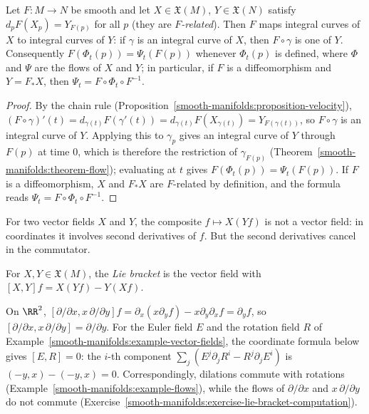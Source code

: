 \begin{proposition}\label{smooth-manifolds:proposition-naturality-flows}
Let $F \colon M \to N$ be smooth and let $X \in \mathfrak{X}(M)$, $Y \in \mathfrak{X}(N)$ satisfy $d_pF(X_p) = Y_{F(p)}$ for all $p$ (they are \emph{$F$-related}).
Then $F$ maps integral curves of $X$ to integral curves of $Y$: if $\gamma$ is an integral curve of $X$, then $F \circ \gamma$ is one of $Y$. Consequently
$F(\Phi_t(p)) = \Psi_t(F(p))$ whenever $\Phi_t(p)$ is defined, where $\Phi$ and $\Psi$ are the flows of $X$ and $Y$; in particular, if $F$ is a diffeomorphism and
$Y = F_*X$, then $\Psi_t = F \circ \Phi_t \circ F^{-1}$.
\end{proposition}

\begin{proof}
By the chain rule (Proposition~\ref{smooth-manifolds:proposition-velocity}), $(F \circ \gamma)'(t) = d_{\gamma(t)}F(\gamma'(t)) = d_{\gamma(t)}F(X_{\gamma(t)}) = Y_{F(\gamma(t))}$,
so $F \circ \gamma$ is an integral curve of $Y$. Applying this to $\gamma_p$ gives an integral curve of $Y$ through $F(p)$ at time $0$, which is therefore the
restriction of $\gamma_{F(p)}$ (Theorem~\ref{smooth-manifolds:theorem-flow}); evaluating at $t$ gives $F(\Phi_t(p)) = \Psi_t(F(p))$. If $F$ is a diffeomorphism,
$X$ and $F_*X$ are $F$-related by definition, and the formula reads $\Psi_t = F \circ \Phi_t \circ F^{-1}$.
\end{proof}

For two vector fields $X$ and $Y$, the composite $f \mapsto X(Yf)$ is not a vector field: in coordinates it involves second derivatives of $f$. But the second
derivatives cancel in the commutator.

\begin{definition}\label{smooth-manifolds:definition-bracket}
For $X, Y \in \mathfrak{X}(M)$, the \emph{Lie bracket} is the vector field with $[X, Y]f = X(Yf) - Y(Xf)$.
\end{definition}

\begin{example}\label{smooth-manifolds:example-bracket}
On $\RR^2$, $[\partial/\partial x, x\,\partial/\partial y]f = \partial_x(x\partial_yf) - x\partial_y\partial_xf = \partial_yf$, so
$[\partial/\partial x, x\,\partial/\partial y] = \partial/\partial y$. For the Euler field $E$ and the rotation field $R$ of
Example~\ref{smooth-manifolds:example-vector-fields}, the coordinate formula below gives $[E, R] = 0$: the $i$-th component
$\sum_j(E^j\partial_jR^i - R^j\partial_jE^i)$ is $(-y, x) - (-y, x) = 0$. Correspondingly, dilations commute with rotations
(Example~\ref{smooth-manifolds:example-flows}), while the flows of $\partial/\partial x$ and $x\,\partial/\partial y$ do not commute
(Exercise~\ref{smooth-manifolds:exercise-lie-bracket-computation}).
\end{example}

